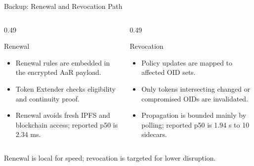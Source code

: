 \documentclass[aspectratio=169,11pt]{beamer}
\newcommand{\tightitems}{%
  \setlength{\topsep}{2pt}%
  \setlength{\itemsep}{4pt}%
  \setlength{\parsep}{0pt}%
}
\newcommand{\pinkbanner}[1]{%
  \begin{center}
  \begin{tcolorbox}[colback=fedacGray,colframe=fedacGray,
                    boxrule=0pt,arc=1mm,left=10pt,right=10pt,top=3pt,bottom=3pt,
                    width=0.96\linewidth,
                    borderline west={2pt}{0pt}{fedacTeal}]
  \footnotesize\color{fedacNavyD}#1
  \end{tcolorbox}
  \end{center}}
\begin{document}
{\begin{frame}[noframenumbering]{Backup: Renewal and Revocation Path}
\vspace{2pt}
\begin{columns}[T,onlytextwidth]
\begin{column}{0.49\textwidth}
\begin{callout}{Renewal}
\begin{itemize}\tightitems
\item Renewal rules are embedded in the encrypted AaR payload.
\item Token Extender checks eligibility and continuity proof.
\item Renewal avoids fresh IPFS and blockchain access; reported p50 is 2.34 ms.
\end{itemize}
\end{callout}
\end{column}
\begin{column}{0.49\textwidth}
\begin{callout}{Revocation}
\begin{itemize}\tightitems
\item Policy updates are mapped to affected OID sets.
\item Only tokens intersecting changed or compromised OIDs are invalidated.
\item Propagation is bounded mainly by polling; reported p50 is 1.94 s to 10 sidecars.
\end{itemize}
\end{callout}
\end{column}
\end{columns}
\vspace{4pt}
\pinkbanner{Renewal is local for speed; revocation is targeted for lower disruption.}
\end{frame}

}
\end{document}
